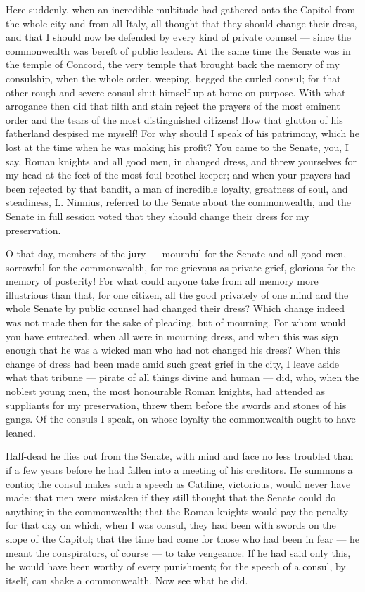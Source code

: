  Here suddenly, when an incredible multitude had gathered onto the Capitol from the whole city and from all Italy, all thought that they should change their dress, and that I should now be defended by every kind of private counsel --- since the commonwealth was bereft of public leaders. At the same time the Senate was in the temple of Concord, the very temple that brought back the memory of my consulship, when the whole order, weeping, begged the curled consul; for that other rough and severe consul shut himself up at home on purpose. With what arrogance then did that filth and stain reject the prayers of the most eminent order and the tears of the most distinguished citizens! How that glutton of his fatherland despised me myself! For why should I speak of his patrimony, which he lost at the time when he was making his profit? You came to the Senate, you, I say, Roman knights and all good men, in changed dress, and threw yourselves for my head at the feet of the most foul brothel-keeper; and when your prayers had been rejected by that bandit, a man of incredible loyalty, greatness of soul, and steadiness, L. Ninnius, referred to the Senate about the commonwealth, and the Senate in full session voted that they should change their dress for my preservation.

 O that day, members of the jury --- mournful for the Senate and all good men, sorrowful for the commonwealth, for me grievous as private grief, glorious for the memory of posterity! For what could anyone take from all memory more illustrious than that, for one citizen, all the good privately of one mind and the whole Senate by public counsel had changed their dress? Which change indeed was not made then for the sake of pleading, but of mourning. For whom would you have entreated, when all were in mourning dress, and when this was sign enough that he was a wicked man who had not changed his dress? When this change of dress had been made amid such great grief in the city, I leave aside what that tribune --- pirate of all things divine and human --- did, who, when the noblest young men, the most honourable Roman knights, had attended as suppliants for my preservation, threw them before the swords and stones of his gangs. Of the consuls I speak, on whose loyalty the commonwealth ought to have leaned.

 Half-dead he flies out from the Senate, with mind and face no less troubled than if a few years before he had fallen into a meeting of his creditors. He summons a contio; the consul makes such a speech as Catiline, victorious, would never have made: that men were mistaken if they still thought that the Senate could do anything in the commonwealth; that the Roman knights would pay the penalty for that day on which, when I was consul, they had been with swords on the slope of the Capitol; that the time had come for those who had been in fear --- he meant the conspirators, of course --- to take vengeance. If he had said only this, he would have been worthy of every punishment; for the speech of a consul, by itself, can shake a commonwealth. Now see what he did.

